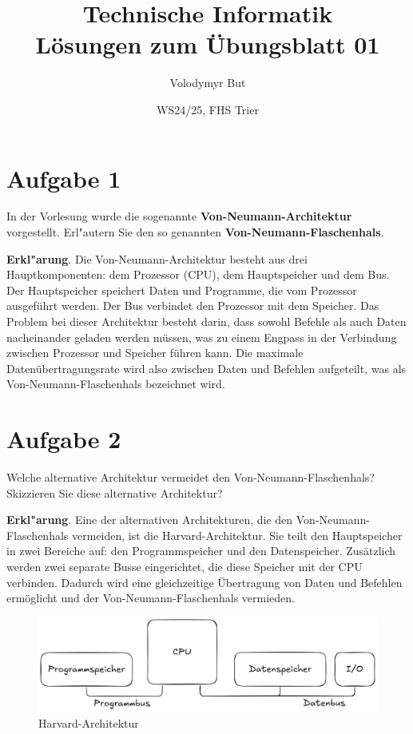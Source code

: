 \documentclass[10pt, a4paper, oneside]{article}
\title{Technische Informatik\\[5pt]\Large{L\"osungen zum \"Ubungsblatt 01}\\[20pt]}
\author{Volodymyr But}
\date{WS24/25, FHS Trier}
\begin{document}
\sloppy

\maketitle
\vspace{25px}

\section{Aufgabe 1}

In der Vorlesung wurde die sogenannte \textbf{Von-Neumann-Architektur}
vorgestellt. Erl"autern Sie den so genannten \textbf{Von-Neumann-Flaschenhals}.

\textbf{Erkl"arung}. Die Von-Neumann-Architektur besteht aus drei
Hauptkomponenten: dem Prozessor (CPU), dem Hauptspeicher und dem Bus. Der
Hauptspeicher speichert Daten und Programme, die vom Prozessor ausgeführt
werden. Der Bus verbindet den Prozessor mit dem Speicher. Das Problem bei dieser
Architektur besteht darin, dass sowohl Befehle als auch Daten nacheinander
geladen werden müssen, was zu einem Engpass in der Verbindung zwischen Prozessor
und Speicher führen kann. Die maximale Datenübertragungsrate wird also zwischen
Daten und Befehlen aufgeteilt, was als Von-Neumann-Flaschenhals bezeichnet wird.

\section{Aufgabe 2}

Welche alternative Architektur vermeidet den Von-Neumann-Flaschenhals?
Skizzieren Sie diese alternative Architektur?

\textbf{Erkl"arung}. Eine der alternativen Architekturen, die den
Von-Neumann-Flaschenhals vermeiden, ist die Harvard-Architektur. Sie teilt den
Hauptspeicher in zwei Bereiche auf: den Programmspeicher und den Datenspeicher.
Zusätzlich werden zwei separate Busse eingerichtet, die diese Speicher mit der
CPU verbinden. Dadurch wird eine gleichzeitige Übertragung von Daten und
Befehlen ermöglicht und der Von-Neumann-Flaschenhals vermieden.

\vspace{10px}
\begin{figure}[h]
    \centering
    \includegraphics[width=1\textwidth]{./assets/harvard-architektur.png}
    \caption{Harvard-Architektur}
\end{figure}
\end{document}
